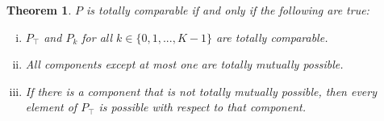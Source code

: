 \documentclass[twoside]{article}
\theoremstyle{plain}%
\newtheorem{theorem}{Theorem}[section]
\theoremstyle{definition}
\theoremstyle{remark}
\begin{document}
\begin{theorem}
\(P\) is totally comparable if and only if the following are true:

\begin{enumerate}[(i)]
\item \label{comp_recs_1} \(P_{\top}\) and \(P_k\) for all \(k \in \{0, 1, ..., K - 1\}\) are totally comparable.
\item \label{comp_recs_2} All components except at most one are totally mutually possible.
\item \label{comp_recs_3} If there is a component that is not totally mutually possible, then every element of \(P_{\top}\) is possible with respect to that component.
\end{enumerate}
\end{theorem}
\end{document}
